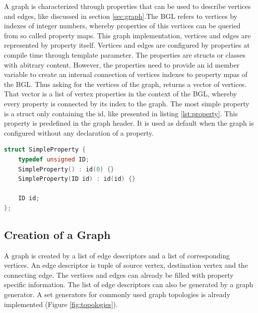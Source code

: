A graph is characterized through properties that can be used to
describe vertices and edges, like discussed in section
\ref{sec:graph}.The BGL refers to vertices by indexes of integer
numbers, whereby properties of this vertices can be queried from so
called property maps. This graph implementation, vertices and edges are
represented by property itself. Vertices and edges are configured by
properties at compile time through template parameter.  The properties
are structs or classes with abitrary content. However, the properties
need to provide an id member variable to create an internal connection
of vertices indexes to property mpas of the BGL.  Thus asking for the
vertices of the graph, returns a vector of vertices. That vector is a
list of vertex properties in the context of the BGL, whereby every
property is connected by its index to the graph. The most simple
property is a struct only containing the id, like presented in listing
\ref{lst:property}. This property is predefined in the graph
header. It is used as default when the graph is configured without any
declaration of a property.

\begin{lstlisting}[language=C++, label=lst:property]
struct SimpleProperty {
    typedef unsigned ID;
    SimpleProperty() : id(0) {}
    SimpleProperty(ID id) : id(id) {}

    ID id;
};
\end{lstlisting}


\subsection{Creation of a Graph}
A graph is created by a list of edge descriptors and a list of
corresponding vertices. An edge descriptor is tuple of source vertex, destination
vertex and the connecting edge. The vertices and edges can already be
filled with property specific information.  The list of edge descriptors can
also be generated by a graph generator. A set generators for commonly used
graph topologies is already implemented (Figure \ref{fig:topologies}).

